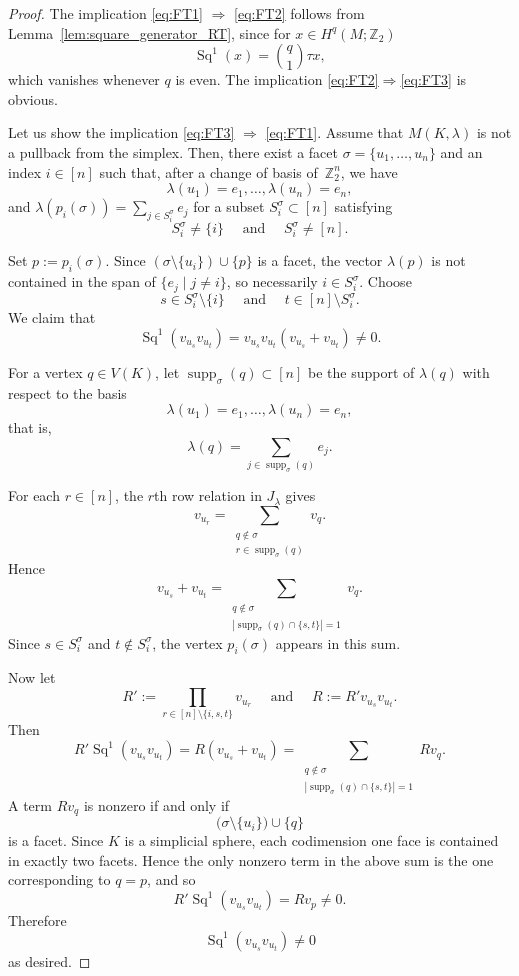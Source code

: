 \documentclass{amsart}
\newcommand{\Z}{\mathbb{Z}}
\newcommand{\supp}{\operatorname{supp}}
\DeclareMathOperator{\Sq}{Sq}
\theoremstyle{plain}
\numberwithin{equation}{section}
\theoremstyle{definition}
\theoremstyle{remark}
\begin{document}
\begin{proof}
    The implication \eqref{eq:FT1} $\Rightarrow$ \eqref{eq:FT2} follows from Lemma~\ref{lem:square_generator_RT}, since for $x \in H^q(M;\Z_2)$
    $$
    \Sq^1(x) = \binom{q}{1}\tau x,
    $$
    which vanishes whenever $q$ is even.
    The implication \eqref{eq:FT2}$\Rightarrow$\eqref{eq:FT3} is obvious.
    
    Let us show the implication \eqref{eq:FT3} $\Rightarrow$ \eqref{eq:FT1}.
    Assume that $M(K,\lambda)$ is not a pullback from the simplex. 
    Then, there exist a facet $\sigma=\{u_1,\dots,u_n\}$ and an index $i\in[n]$ such that, after a change of basis of~$\Z_2^n$, we have
    $$
        \lambda(u_1)=e_1,\dots,\lambda(u_n)=e_n,
    $$ and $\lambda(p_i (\sigma))=\sum_{j\in S_i^\sigma}e_j$ for a subset $S_i^\sigma \subset[n]$ satisfying
    $$
        S_i^\sigma \neq \{i\} \quad \text{ and }\quad S_i^\sigma \neq [n].
    $$
    
    Set $p:=p_i (\sigma)$.
    Since $(\sigma\setminus\{u_i\})\cup\{p\}$ is a facet, the vector $\lambda(p)$ is not contained in the span of $\{e_j\mid j\neq i\}$, so necessarily $i\in S_i^\sigma$.
    Choose
    $$
        s\in S_i^\sigma \setminus\{i\} \quad \text{ and } \quad t \in [n]\setminus S_i^\sigma.
    $$
    We claim that
    $$
        \Sq^1(v_{u_s} v_{u_t})= v_{u_s} v_{u_t}(v_{u_s} + v_{u_t})\neq 0.
    $$
    
    For a vertex $q \in V(K)$, let $\supp_\sigma(q)\subset[n]$ be the support of $\lambda(q)$ with respect to the basis
    $$
        \lambda(u_1)=e_1,\dots,\lambda(u_n)=e_n,
    $$
    that is,
    $$
        \lambda(q)=\sum_{j\in \supp_\sigma(q)} e_j.
    $$
    
    For each $r\in[n]$, the $r$th row relation in $J_\lambda$ gives
    $$
        v_{u_r} = \sum_{\substack{q\notin \sigma\\ r\in \supp_\sigma(q)}} v_q.
    $$
    Hence
    $$
    v_{u_s}+v_{u_t} = \sum_{\substack{q\notin \sigma\\ |\supp_\sigma(q)\cap\{s,t\}|=1}} v_q.
    $$
    Since $s\in S_i^\sigma$ and $t\notin S_i^\sigma$, the vertex $p_i(\sigma)$ appears in this sum.
    
    Now let
    $$
        R':=\prod_{r\in[n]\setminus\{i,s,t\}} v_{u_r} \quad \text{ and } \quad R := R' v_{u_s} v_{u_t}.
    $$
    Then
    $$
        R' \Sq^1(v_{u_s}v_{u_t}) = R(v_{u_s}+v_{u_t}) = \sum_{\substack{q\notin \sigma\\ |\supp_\sigma(q)\cap\{s,t\}|=1}} Rv_q.
    $$
    A term $Rv_q$ is nonzero if and only if
    $$
        \bigl(\sigma\setminus\{u_i\}\bigr)\cup\{q\}
    $$
    is a facet.
    Since $K$ is a simplicial sphere, each codimension one face is contained in exactly two facets. 
    Hence the only nonzero term in the above sum is the one corresponding to $q=p$, and so
    $$
        R'  \Sq^1(v_{u_s}v_{u_t}) = R v_{p}\neq 0.
    $$
    Therefore
    $$
        \Sq^1(v_{u_s}v_{u_t})\neq 0
    $$
    as desired.
\end{proof}
\end{document}
